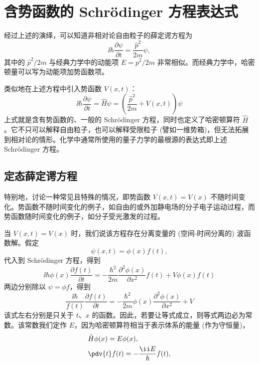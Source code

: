 \section{含势函数的 Schr\"odinger 方程表达式}%

经过上述的演绎，可以知道非相对论自由粒子的薛定谔方程为
\begin{equation}
\ii \hbar \frac{\partial \psi}{\partial t} = \frac{\hat p^2}{2 m} \psi,
\end{equation}
其中的 $\hat p^2 / 2m$ 与经典力学中的动能项 $E = p^2 / 2m$ 非常相似。而经典力学中，哈密顿量可以写为动能项加势函数项。

类似地在上述方程中引入势函数 $V(x, t)$：
\begin{equation}
\ii \hbar \frac{\partial \psi}{\partial t} = \hat H \psi = \left( \frac{\hat p^2}{2 m} + V(x, t) \right) \psi
\end{equation}
上式就是含有势函数的、一般的 Schr\"odinger 方程，同时也定义了哈密顿算符 $\hat H$。它不只可以解释自由粒子，也可以解释受限粒子 (譬如一维势箱)，但无法拓展到相对论的情形。化学中通常所使用的量子力学的最根源的表达式即上述 Schr\"odinger 方程。

\subsection{定态薛定谔方程}
特别地，讨论一种常见且特殊的情况，即势函数 $V(x, t) = V(x)$ 不随时间变化。势函数不随时间变化的例子，如自由的或外加静电场的分子电子运动过程，而势函数随时间变化的例子，如分子受光激发的过程。

当 $V(x, t) = V(x)$ 时，我们说该方程存在分离变量的 (空间-时间分离的) 波函数解。假定
\begin{equation}
\psi(x, t) = \phi(x) f(t),
\end{equation}
代入到 Schr\"odinger 方程，得到
\begin{equation}
\ii \hbar \phi(x) \frac{\partial f(t)}{\partial t} = - \frac{\hbar^2}{2 m} \frac{\partial^2 \phi(x)}{\partial x^2} f(t) + V \phi(x) f(t)
\end{equation}
两边分别除以 $\psi = \phi f$，得到
\begin{equation}
\frac{\ii \hbar}{f(t)} \frac{\partial f(t)}{\partial t} = - \frac{\hbar^2}{2 m} \phi(x) \frac{\partial^2 \phi(x)}{\partial x^2} + V 
\end{equation}
该式左右分别是只关于 $t$、$x$ 的函数。因此，若要让等式成立，则等式两边必为常数。该常数我们定作 $E$，因为哈密顿算符相当于表示体系的能量 (作为守恒量)，
\begin{align}
    &\hat H \phi(x) = E \phi(x), \\
    &\pdv{t} f(t) = -\frac{\ii E}\hbar f(t),
\end{align}

